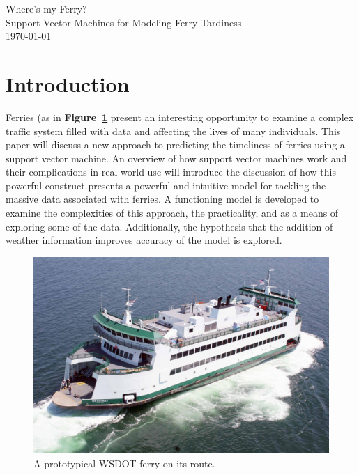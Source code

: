 \documentclass[11pt]{article} %
\begin{document}
\begin{titlepage}
    \vspace*{\fill}
    \begin{center}
      \Huge{Where's my Ferry?}\\[0.5cm]
      \Large{Support Vector Machines for Modeling Ferry Tardiness}\\[0.4cm]
      \today
    \end{center}
    \vspace*{\fill}
  \end{titlepage}
\newpage
\vspace*{\fill}
\tableofcontents
\vspace*{\fill}
\newpage

\section{Introduction}
\label{sec:intro}
Ferries (as in \textbf{Figure~\ref{fig:basicferry}} present an interesting 
opportunity to examine a complex traffic system filled with data and affecting 
the lives of many individuals. This paper will discuss a new approach to predicting 
the timeliness of ferries using a support vector machine.  An overview of how 
support vector machines work and their complications in real world use will 
introduce the discussion of how this powerful construct presents a powerful and 
intuitive model for tackling the massive data associated with ferries.  A 
functioning model is developed to examine the complexities of this
approach, the practicality, and as a means of exploring some of the data. 
Additionally, the hypothesis that the addition of weather information improves 
accuracy of the model is explored.

\begin{figure}[h]
  \centering
  \includegraphics[scale=.15]{images/ferry.jpg}
  \caption{A prototypical WSDOT ferry on its route.}
  \label{fig:basicferry}
\end{figure}
\end{document}
